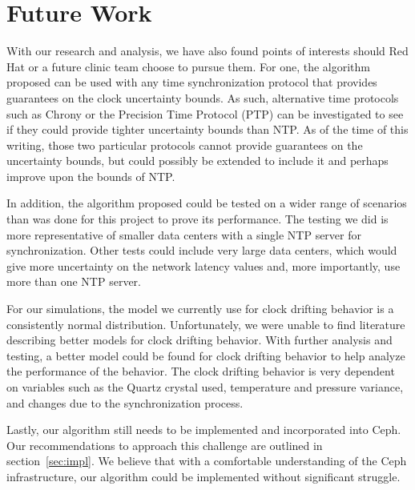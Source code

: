 \chapter{Future Work}
\label{sec:future}

With our research and analysis, we have also found points of interests
should Red Hat or a future clinic team choose to pursue them. For one,
the algorithm proposed can be used with any time synchronization
protocol that provides guarantees on the clock uncertainty bounds. As
such, alternative time protocols such as Chrony or the Precision Time
Protocol (PTP) can be investigated to see if they could provide
tighter uncertainty bounds than NTP. As of the time of this writing,
those two particular protocols cannot provide guarantees on the
uncertainty bounds, but could possibly be extended to include it and
perhaps improve upon the bounds of NTP.

In addition, the algorithm proposed could be tested on a wider range
of scenarios than was done for this project to prove its
performance. The testing we did is more representative of smaller data
centers with a single NTP server for synchronization. Other tests
could include very large data centers, which would give more
uncertainty on the network latency values and, more importantly, use
more than one NTP server.

For our simulations, the model we currently use for clock drifting
behavior is a consistently normal distribution. Unfortunately, we were
unable to find literature describing better models for clock drifting
behavior. With further analysis and testing, a better model could be
found for clock drifting behavior to help analyze the performance of
the behavior. The clock drifting behavior is very dependent on
variables such as the Quartz crystal used, temperature and pressure
variance, and changes due to the synchronization process.



Lastly, our algorithm still needs to be implemented and incorporated
into Ceph. Our recommendations to approach this challenge are outlined
in section~\ref{sec:impl}. We believe that with a comfortable
understanding of the Ceph infrastructure, our algorithm could be
implemented without significant struggle.
